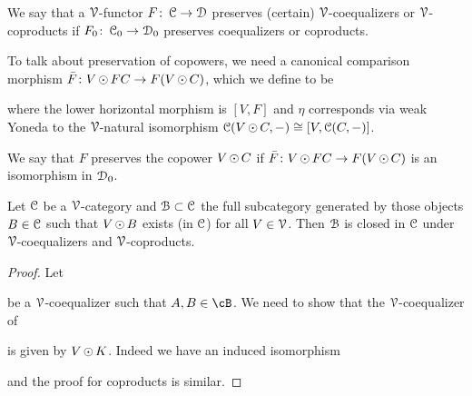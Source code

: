 \documentclass[a4paper,11pt,oneside,openany]{scrbook}
\begin{document}
\begin{defn}
	We say that a $\V$-functor $F \from \C \to \D$ preserves (certain) $\V$-coequalizers or $\V$-coproducts if $F_{0} \from \C_{0} \to \D_{0}$ preserves
	coequalizers or coproducts.
\end{defn}

To talk about preservation of copowers, we need a canonical comparison morphism $\bar{F} \from V\copw FC \to F(V\copw C)$, which we define to be
\begin{center}
\end{center}
where the lower horizontal morphism is $[V,F]$ and $\eta$ corresponds via weak
Yoneda to the $\V$-natural isomorphism $\C(V\copw C,-) \iso [V,\C(C,-)]$.

\begin{defn}
	We say that $F$ preserves the copower $V \copw C$ if $\bar{F} \from V \copw FC \to F(V \copw C)$ is an isomorphism in $\D_{0}$.
\end{defn}

\begin{lemma}
	Let $\C$ be a $\V$-category and $\B \subset \C$ the full subcategory
    generated by those objects $B \in \C$ such that $V \copw B$ exists (in $\C$)
    for all $V \in \V$. Then $\B$ is closed in $\C$ under $\V$-coequalizers and
    $\V$-coproducts.
\end{lemma}

\begin{proof}
	Let
	\begin{center}
	\end{center}
	be a $\V$-coequalizer such that $A,B\in\cB$. We need to show that the
    $\V$-coequalizer of
	\begin{center}
	\end{center}
	is given by $V \copw K$. Indeed we have an induced isomorphism
	\begin{center}
	\end{center}
	and the proof for coproducts is similar.
\end{proof}
\end{document}

